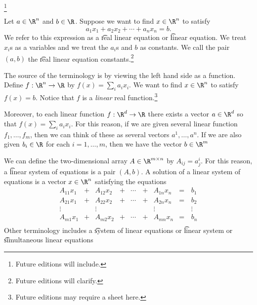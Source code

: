 
\footnote{Future editions will include.}


Let $a \in \R^n$ and $b \in \R$.
Suppose we want to find $x \in \R^n$ to satisfy
\[
  a_1x_1 + a_2x_2 + \cdots + a_nx_n = b.
\]
We refer to this expression as a \t{real linear equation} or \t{linear equation}.
We treat $x_i$s as a variables and we treat the $a_i$s and $b$ as constants.
We call the pair $(a, b)$ the \t{real linear equation constants}.\footnote{Future editions will clarify.}

The source of the terminology  is by viewing the left hand side as a function.
Define $f: \R^n \to \R$ by $f(x) = \sum_{i}a_ix_i$.
We want to find $x \in \R^n$ to satisfy $f(x) = b$.
Notice that $f$ is a \textit{linear} real function.\footnote{Future editions may require a sheet here.}

Moreover, to each linear function $f: \R^d \to \R$ there exists a vector $a \in \R^d$ so that $f(x) = \sum_{i} a_ix_i$.
For this reason, if we are given several linear function $f_1, \dots, f_m$, then we can think of these as several vectors $a^1, \dots, a^n$.
If we are also given $b_i \in \R$ for each $i = 1, \dots, m$, then we have the vector $b \in \R^m$

We can define the two-dimensional array $A \in \R^{m \times n}$ by $A_{ij} = a^{i}_j$.
For this reason, a \t{linear system of equations} is a pair $(A, b)$.
A solution of a linear system of equations is a vector $x \in \R^n$ satisfying the equations
\[
  \begin{aligned}
    A_{11}x_1 & + & A_{12}x_2 & + & \cdots \, & + & A_{1n}x_n & = \, & b_1 \\
    A_{21}x_1 & + & A_{22}x_2 & + & \cdots & + & A_{2n}x_n & = & b_2 \\
    \vdots    &   & \vdots    &   &        &   & \vdots    &   & \vdots \\
    A_{m1}x_1 & + & A_{m2}x_2 & + & \cdots & + & A_{mn}x_n & = & b_n \\
  \end{aligned}
\]
Other terminology includes a \t{system of linear equations} or \t{linear system} or \t{simultaneous linear equations}

